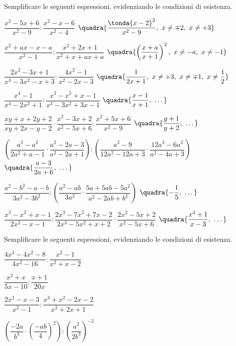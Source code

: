 \begin{esercizio}[\Ast]
\label{ese:19.19}
Semplificare le seguenti espressioni, evidenziando le condizioni di esistenza.
\begin{enumeratea}
 \item \(\dfrac{x^{2}-5x+6}{x^{2}-9}:\dfrac{x^{2}-x-6}{x^{2}-4}\)
  \hfill {\footnotesize \(\quadra{\dfrac{\tonda{x-2}^2}{x^2-9},~ 
    x \neq \mp 2,~x \neq +3}\)}
 \item \(\dfrac{x^{2}+ax-x-a}{x^{2}-1}:\dfrac{x^{2}+2x+1}{x^{2}+x+ax+a}\)
  \hfill {\footnotesize \(\quadra{\left(\dfrac{x+a}{x+1}\right)^{2},~ 
    x \neq -a,~x \neq -1}\)}
 \item \(\dfrac{2x^{2}-3x+1}{x^{3}-3x^{2}-x+3}:\dfrac{4x^{2}-1}{x^{2}-2x-3}\)
  \hfill {\footnotesize \(\quadra{\dfrac{1}{2x+1},~ 
    x \neq +3,~x \neq \mp 1,~x \neq \dfrac{1}{2}}\)}
 \item \(\dfrac{x^{4}-1}{x^{4}-2x^{2}+1}:
        \dfrac{x^{3}-x^{2}+x-1}{x^{3}-3x^{2}+3x-1}\)
  \hfill {\footnotesize \(\quadra{\dfrac{x-1}{x+1},~\dots}\)}
 \item \(\dfrac{xy+x+2y+2}{xy+2x-y-2}\cdot
 \dfrac{x^{2}-3x+2}{x^{2}-5x+6}:\dfrac{x^{2}+5x+6}{x^{2}-9}\)
  \hfill {\footnotesize \(\quadra{\dfrac{y+1}{y+2},~\dots}\)}
 \item \(\left(\dfrac{a^{3}-a^{2}}{2a^{2}+a-1}\cdot
 \dfrac{a^{2}-2a-3}{a^{2}-2a+1}\right):
 \left(\dfrac{a^{2}-9}{12a^{2}-12a+3}\cdot
 \dfrac{12a^{3}-6a^{2}}{a^{2}-4a+3}\right)\)
  \hfill {\footnotesize \(\quadra{\dfrac{a-3}{2a+6},~\dots}\)}
 \item \(\dfrac{a^{2}-b^{2}-a-b}{3a^{2}-3b^{2}}:
 \left(\dfrac{a^{2}-ab}{3a^{2}}\cdot
 \dfrac{5a+5ab-5a^{2}}{a^{2}-2ab+b^{2}}\right)\)
  \hfill {\footnotesize \(\quadra{-{\dfrac{1}{5}},~\dots}\)}
 \item \(\dfrac{x^{3}-x^{2}+x-1}{2x^{2}-x-1}:
 \dfrac{2x^{3}-7x^{2}+7x-2}{2x^{3}-5x^{2}+x+2}\cdot
 \dfrac{2x^{2}-5x+2}{x^{2}-5x+6}\)
  \hfill {\footnotesize \(\quadra{\dfrac{x^{2}+1}{x-3},~\dots}\)}
\end{enumeratea}
\end{esercizio}

\newpage %

\begin{esercizio}
\label{ese:19.21}
Semplificare le seguenti espressioni, evidenziando le condizioni di esistenza.
\begin{multicols}{2}
\begin{enumeratea}
 \item \(\dfrac{4x^{3}-4x^{2}-8}{4x^{2}-16}:\dfrac{x^{2}-1}{x^{2}+x-2}\)
 \item \(\dfrac{x^{2}+x}{5x-10}:\dfrac{x+1}{20x}\)
 \item \(\dfrac{2x^{2}-x-3}{x^{2}-1}:\dfrac{x^{3}+x^{2}-2x-2}{x^{2}+2x+1}\)
 \item \(\left(\dfrac{-{2a}}{b^{3}}\cdot
        \left(\dfrac{-{ab}}{4}\right)^{2}\right):
        \left(\dfrac{a^{2}}{2b^{3}}\right)^{-2}\)%
\end{enumeratea}
\end{multicols}
\end{esercizio}

